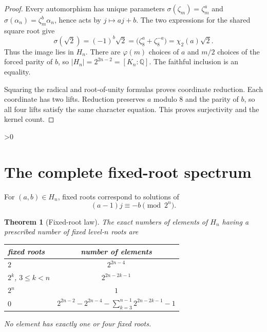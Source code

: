 \documentclass[10pt]{article}
\newtheorem{theorem}{Theorem}
\newcommand{\Q}{\mathbb Q}
\begin{document}
\begin{proof}
Every automorphism has unique parameters
$\sigma(\zeta_m)=\zeta_m^a$ and
$\sigma(\alpha_n)=\zeta_m^b\alpha_n$, hence acts by $j\mapsto aj+b$.
The two expressions for the shared square root give
\[
 \sigma(\sqrt2)=(-1)^b\sqrt2
 =\bigl(\zeta_8^a+\zeta_8^{-a}\bigr)=\chi_2(a)\sqrt2.
\]
Thus the image lies in $H_n$.  There are $\varphi(m)$ choices of $a$ and
$m/2$ choices of the forced parity of $b$, so
$|H_n|=2^{2n-2}=[K_n:\Q]$.  The faithful inclusion is an equality.

Squaring the radical and root-of-unity formulas proves coordinate
reduction.  Each coordinate has two lifts.  Reduction preserves $a$ modulo
$8$ and the parity of $b$, so all four lifts satisfy the same character
equation.  This proves surjectivity and the kernel count.
\end{proof}

\begin{center}
\end{center}

\ifnum\CRevisionRound>0
\section{The complete fixed-root spectrum}
For $(a,b)\in H_n$, fixed roots correspond to solutions of
\begin{equation}\label{eq:linear}
 (a-1)j\equiv-b\pmod {2^n}.
\end{equation}

\begin{theorem}[Fixed-root law]\label{thm:fixed}
The exact numbers of elements of $H_n$ having a prescribed number of fixed
level-$n$ roots are
\begin{center}
\begin{tabular}{@{}lc@{}}
\toprule
fixed roots & number of elements\\
\midrule
$2$ & $2^{2n-4}$\\
$2^k$, $3\le k<n$ & $2^{2n-2k-1}$\\
$2^n$ & $1$\\
$0$ & $2^{2n-2}-2^{2n-4}-\displaystyle\sum_{k=3}^{n-1}2^{2n-2k-1}-1$\\
\bottomrule
\end{tabular}
\end{center}
No element has exactly one or four fixed roots.
\end{theorem}
\end{document}
